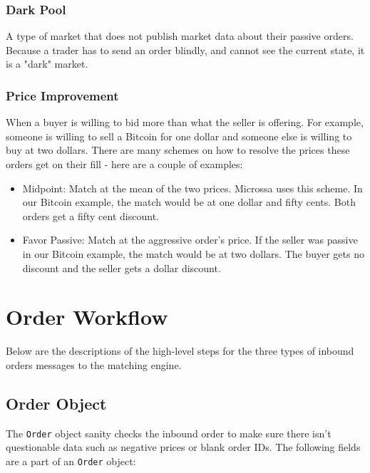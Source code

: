 \documentclass[Letter]{article}
\begin{document}
\subsubsection{Dark Pool}

A type of market that does not publish market data about their passive
orders.  Because a trader has to send an order blindly, and cannot see
the current state, it is a "dark" market.

\subsubsection{Price Improvement}
When a buyer is willing to bid more than what the seller is offering.
For example, someone is willing to sell a Bitcoin for one dollar and
someone else is willing to buy at two dollars.  There are many schemes
on how to resolve the prices these orders get on their fill - here are
a couple of examples:
\begin{itemize}
    \item Midpoint: Match at the mean of the two prices.  Microssa uses
    this scheme.  In our Bitcoin example, the match would be at one
    dollar and fifty cents.  Both orders get a fifty cent discount.
    \item Favor Passive: Match at the aggressive order's price.  If the
    seller was passive in our Bitcoin example, the match would be at
    two dollars. The buyer gets no discount and the seller gets a
    dollar discount.
\end{itemize}

\newpage
\section{Order Workflow}

Below are the descriptions of the high-level steps for the three types
of inbound orders messages to the matching engine.

\subsection{Order Object}

The \texttt{Order} object sanity checks the inbound order to make sure
there isn't questionable data such as negative prices or blank order IDs.
The following fields are a part of an \texttt{Order} object:
\end{document}
